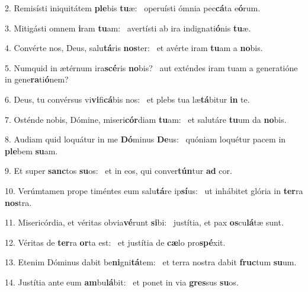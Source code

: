 2. Remisísti iniquitátem \textbf{ple}bis \textbf{tu}æ: \ast\  operuísti ómnia pec\textbf{cá}ta e\textbf{ó}rum.\

3. Mitigásti omnem \textbf{i}ram \textbf{tu}am: \ast\  avertísti ab ira indignati\textbf{ó}nis \textbf{tu}æ.\

4. Convérte nos, Deus, salu\textbf{tá}ris \textbf{nos}ter: \ast\  et avérte iram \textbf{tu}am a \textbf{no}bis.\

5. Numquid in ætérnum ira\textbf{scé}ris \textbf{no}bis? \ast\  aut exténdes iram tuam a generatióne in gene\textbf{ra}ti\textbf{ó}nem?\

6. Deus, tu convérsus vi\textbf{vi}fi\textbf{cá}bis nos: \ast\  et plebs tua læ\textbf{tá}bitur \textbf{in} te.\

7. Osténde nobis, Dómine, miseri\textbf{cór}diam \textbf{tu}am: \ast\  et salutáre \textbf{tu}um da \textbf{no}bis.\

8. Audiam quid loquátur in me \textbf{Dó}minus \textbf{De}us: \ast\  quóniam loquétur pacem in \textbf{ple}bem \textbf{su}am.\

9. Et super \textbf{sanc}tos \textbf{su}os: \ast\  et in eos, qui conver\textbf{tún}tur \textbf{ad} cor.\

10. Verúmtamen prope timéntes eum salu\textbf{tá}re ip\textbf{sí}us: \ast\  ut inhábitet glória in \textbf{ter}ra \textbf{nos}tra.\

11. Misericórdia, et véritas obvia\textbf{vé}runt \textbf{si}bi: \ast\  justítia, et pax \textbf{os}cu\textbf{lá}tæ sunt.\

12. Véritas de \textbf{ter}ra \textbf{or}ta est: \ast\  et justítia de \textbf{cæ}lo pro\textbf{spé}xit.\

13. Etenim Dóminus dabit be\textbf{ni}gni\textbf{tá}tem: \ast\  et terra nostra dabit \textbf{fruc}tum \textbf{su}um.\

14. Justítia ante eum \textbf{am}bu\textbf{lá}bit: \ast\  et ponet in via \textbf{gres}sus \textbf{su}os.\


